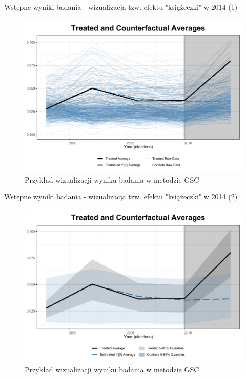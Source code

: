 \documentclass[12pt]{beamer}
\begin{document}
\begin{frame}{Wstępne wyniki badania - wizualizacja tzw. efektu "książeczki" w 2014 (1)}
    
\begin{figure}
\includegraphics[scale=0.42]{ife_no_pred_2_factors_sample_0_2_raw.pdf}
\caption{\label{fig:did}Przykład wizualizacji wyniku badania w metodzie GSC}
\end{figure}
    
\end{frame}

\begin{frame}{Wstępne wyniki badania - wizualizacja tzw. efektu "książeczki" w 2014 (2)}
    
\begin{figure}
\includegraphics[scale=0.42]{ife_no_pred_2_factors_sample_0_2_band}
\caption{\label{fig:did}Przykład wizualizacji wyniku badania w metodzie GSC}
\end{figure}
    
\end{frame}
\end{document}
